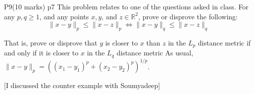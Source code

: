 \documentclass[a4paper, 11pt]{article}
\begin{document}
\begin{problem}{%
		P9\hfill  (10 marks)
	}{p7%
	}
This problem relates to one of the questions asked in class. For any $p, q \geq 1$, and any points $x, y$, and $z \in \mathbb{R}^2$, prove or disprove the following:
		$$
		\|x-y\|_p \leq\|x-z\|_p \Leftrightarrow\|x-y\|_q \leq\|x-z\|_q
		$$

	
	That is, prove or disprove that $y$ is closer to $x$ than $z$ in the $L_p$ distance metric if and only if it is closer to $x$ in the $L_q$ distance metric
	As usual, $\|x-y\|_p=\left(\left(x_1-y_1\right)^p+\left(x_2-y_2\right)^p\right)^{1 / p}$.
\end{problem}
\parinf

[I discussed the counter example with Soumyadeep]
\end{document}
